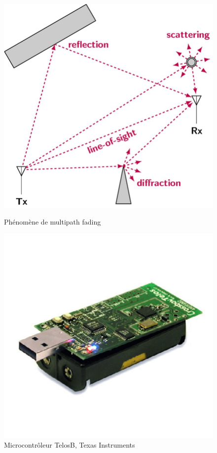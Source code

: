 \documentclass[]{report}
\begin{document}
\begin{figure}[!ht]
	\centering
	\begin{minipage}{0.43\textwidth}
		\centering
		\includegraphics[width=\textwidth]{multipath}
		\caption{Phénomène de multipath fading\cite{multipath}}
		\label{fig:multipath}
	\end{minipage}\hfill
	\begin{minipage}{0.43\textwidth}
		\centering
		\includegraphics[width=\textwidth]{TelosB}
		\caption{Microcontrôleur TelosB, Texas Instruments \cite{telosb}}
		\label{fig:telosb}
	\end{minipage}	
\end{figure}
\end{document}
